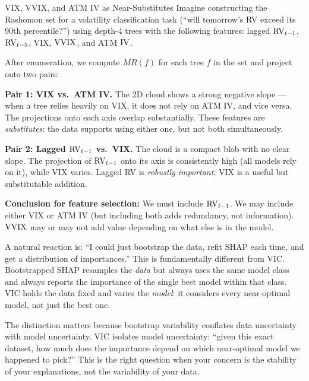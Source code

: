 \begin{workedexample}{VIX, VVIX, and ATM IV as Near-Substitutes}
Imagine constructing the Rashomon set for a volatility classification task
(``will tomorrow's RV exceed its 90th percentile?'') using depth-4 trees
with the following features: lagged $\operatorname{RV}_{t-1}$, $\operatorname{RV}_{t-5}$, VIX, $\operatorname{VVIX}$,
and ATM $\operatorname{IV}$.

After enumeration, we compute $MR(f)$ for each tree $f$ in the set and
project onto two pairs:

\textbf{Pair 1: VIX vs.\ ATM IV.}  The 2D cloud shows a strong negative
slope --- when a tree relies heavily on VIX, it does not rely on ATM IV, and
vice versa.  The projections onto each axis overlap substantially.  These
features are \emph{substitutes}: the data supports using either one, but not
both simultaneously.

\textbf{Pair 2: Lagged $\operatorname{RV}_{t-1}$ vs.\ VIX.}  The cloud is a compact blob
with no clear slope.  The projection of $\operatorname{RV}_{t-1}$ onto its axis is
consistently high (all models rely on it), while VIX varies.  Lagged RV is
\emph{robustly important}; VIX is a useful but substitutable addition.

\medskip
\noindent\textbf{Conclusion for feature selection:}  We must include
$\operatorname{RV}_{t-1}$.  We may include either VIX or ATM IV (but including both adds
redundancy, not information).  $\operatorname{VVIX}$ may or may not add value depending on
what else is in the model.
\end{workedexample}

\begin{keyidea}
A natural reaction is: ``I could just bootstrap the data, refit SHAP each
time, and get a distribution of importances.''  This is fundamentally
different from VIC.  Bootstrapped SHAP resamples the \emph{data} but always
uses the same model class and always reports the importance of the single
best model within that class.  VIC holds the data fixed and varies the
\emph{model}: it considers every near-optimal model, not just the best one.

The distinction matters because bootstrap variability conflates data
uncertainty with model uncertainty.  VIC isolates model uncertainty: ``given
this exact dataset, how much does the importance depend on which near-optimal
model we happened to pick?''  This is the right question when your concern
is the stability of your explanations, not the variability of your data.
\end{keyidea}

